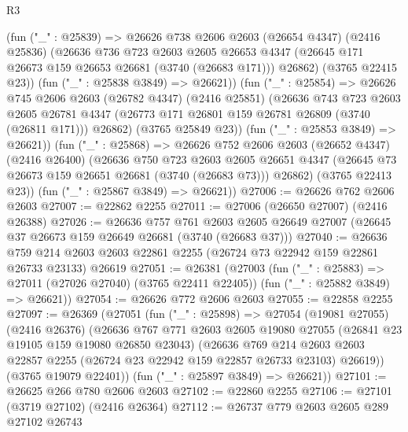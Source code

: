 \begin{lexlean}{R3}
\begin{coremodule}
          (fun ("_" : @25839) =>
          @26626
            @738
            @2606
            @2603
            (@26654 @4347)
            (@2416 @25836)
            (@26636
              @736
              @723
              @2603
              @2605
              @26653
              @4347
              (@26645 @171 @26673 @159 @26653 @26681 (@3740 (@26683 @171)))
              @26862)
            (@3765 @22415 @23))
          (fun ("_" : @25838 @3849) => @26621))
        (fun ("_" : @25854) =>
        @26626
          @745
          @2606
          @2603
          (@26782 @4347)
          (@2416 @25851)
          (@26636
            @743
            @723
            @2603
            @2605
            @26781
            @4347
            (@26773 @171 @26801 @159 @26781 @26809 (@3740 (@26811 @171)))
            @26862)
          (@3765 @25849 @23))
        (fun ("_" : @25853 @3849) => @26621))
      (fun ("_" : @25868) =>
      @26626
        @752
        @2606
        @2603
        (@26652 @4347)
        (@2416 @26400)
        (@26636
          @750
          @723
          @2603
          @2605
          @26651
          @4347
          (@26645 @73 @26673 @159 @26651 @26681 (@3740 (@26683 @73)))
          @26862)
        (@3765 @22413 @23))
      (fun ("_" : @25867 @3849) => @26621))
@27006 := @26626 @762 @2606 @2603
@27007 := @22862 @2255
@27011 := @27006 (@26650 @27007) (@2416 @26388)
@27026 := @26636
    @757
    @761
    @2603
    @2605
    @26649
    @27007
    (@26645 @37 @26673 @159 @26649 @26681 (@3740 (@26683 @37)))
@27040 := @26636
    @759
    @214
    @2603
    @2603
    @22861
    @2255
    (@26724 @73 @22942 @159 @22861 @26733 @23133)
    @26619
@27051 := @26381
    (@27003
      (fun ("_" : @25883) => @27011 (@27026 @27040) (@3765 @22411 @22405))
      (fun ("_" : @25882 @3849) => @26621))
@27054 := @26626 @772 @2606 @2603
@27055 := @22858 @2255
@27097 := @26369
    (@27051
      (fun ("_" : @25898) =>
      @27054
        (@19081 @27055)
        (@2416 @26376)
        (@26636
          @767
          @771
          @2603
          @2605
          @19080
          @27055
          (@26841 @23 @19105 @159 @19080 @26850 @23043)
          (@26636
            @769
            @214
            @2603
            @2603
            @22857
            @2255
            (@26724 @23 @22942 @159 @22857 @26733 @23103)
            @26619))
        (@3765 @19079 @22401))
      (fun ("_" : @25897 @3849) => @26621))
@27101 := @26625 @266 @780 @2606 @2603
@27102 := @22860 @2255
@27106 := @27101 (@3719 @27102) (@2416 @26364)
@27112 := @26737 @779 @2603 @2605 @289 @27102 @26743

\end{coremodule}
\end{lexlean}
